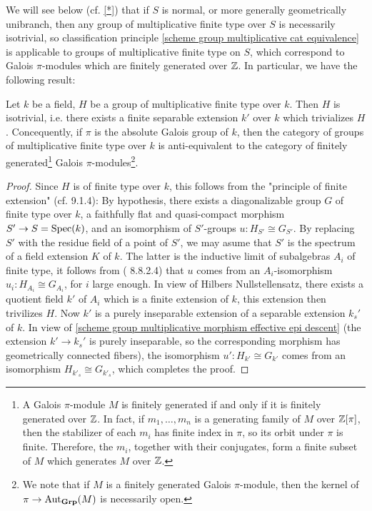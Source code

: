 We will see below (cf. \cref{*}) that if $S$ is normal, or more generally geometrically unibranch, then any group of multiplicative finite type over $S$ is necessarily isotrivial, so classification principle \cref{scheme group multiplicative cat equivalence} is applicable to groups of multiplicative finite type on $S$, which correspond to Galois $\pi$-modules which are finitely generated over $\mathbb{Z}$. In particular, we have the following result:

\begin{proposition}\label{scheme alg group multiplicative cat equivalence}
Let $k$ be a field, $H$ be a group of multiplicative finite type over $k$. Then $H$ is isotrivial, i.e. there exists a finite separable extension $k'$ over $k$ which trivializes $H$. Concequently, if $\pi$ is the absolute Galois group of $k$, then the category of groups of multiplicative finite type over $k$ is anti-equivalent to the category of finitely generated\footnote{A Galois $\pi$-module $M$ is finitely generated if and only if it is finitely generated over $\mathbb{Z}$. In fact, if $m_1,\dots,m_n$ is a generating family of $M$ over $\mathbb{Z}[\pi]$, then the stabilizer of each $m_i$ has finite index in $\pi$, so its orbit under $\pi$ is finite. Therefore, the $m_i$, together with their conjugates, form a finite subset of $M$ which generates $M$ over $\mathbb{Z}$.} Galois $\pi$-modules\footnote{We note that if $M$ is a finitely generated Galois $\pi$-module, then the kernel of $\pi\to\mathrm{Aut}_{\mathbf{Grp}}(M)$ is necessarily open.}.
\end{proposition}
\begin{proof}
Since $H$ is of finite type over $k$, this follows from the "principle of finite extension" (cf. \cite{EGA4-3} 9.1.4): By hypothesis, there exists a diagonalizable group $G$ of finite type over $k$, a faithfully flat and quasi-compact morphism $S'\to S=\mathrm{Spec}(k)$, and an isomorphism of $S'$-groups $u:H_{S'}\cong G_{S'}$. By replacing $S'$ with the residue field of a point of $S'$, we may asume that $S'$ is the spectrum of a field extension $K$ of $k$. The latter is the inductive limit of subalgebras $A_i$ of finite type, it follows from (\cite{EGA4-3} 8.8.2.4) that $u$ comes from an $A_i$-isomorphism $u_i:H_{A_i}\cong G_{A_i}$, for $i$ large enough. In view of Hilbers Nullstellensatz, there exists a quotient field $k'$ of $A_i$ which is a finite extension of $k$, this extension then trivilizes $H$. Now $k'$ is a purely inseparable extension of a separable extension $k_s'$ of $k$. In view of \cref{scheme group multiplicative morphism effective epi descent} (the extension $k'\to k_s'$ is purely inseparable, so the corresponding morphism has geometrically connected fibers), the isomorphism $u':H_{k'}\cong G_{k'}$ comes from an isomorphism $H_{k'_s}\cong G_{k'_s}$, which completes the proof.
\end{proof}

